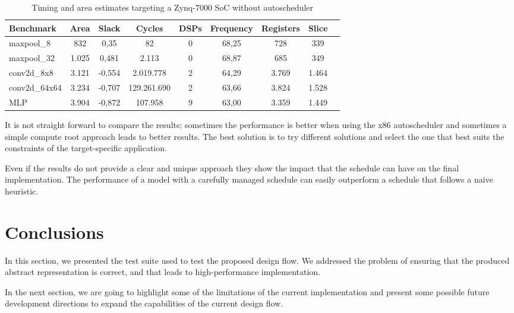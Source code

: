 \documentclass[../main.tex]{subfiles}
\begin{document}
\begin{table}[h]
\centering
\footnotesize
\setlength{\tabcolsep}{4pt}
\begin{tabular}{lcccccccc}
\hline
\textbf{Benchmark} & \textbf{Area} & \textbf{Slack} & \textbf{Cycles} & \textbf{DSPs} & \textbf{Frequency} & \textbf{Registers} & \textbf{Slice} \\ \hline
maxpool\_8       & 832    & 0,35  & 82           & 0             & 68,25              & 728        & 339        \\
maxpool\_32      & 1.025     & 0,481  & 2.113           & 0             & 68,87              & 685        & 349         \\
conv2d\_8x8   & 3.121    & -0,554  & 2.019.778           & 2            & 64,29              & 3.769        & 1.464        \\ 
conv2d\_64x64   & 3.234    & -0,707  & 129.261.690           & 2            & 63,66              & 3.824        & 1.528        \\ 
MLP          & 3.904     & -0,872  & 107.958               & 9             & 63,00              & 3.359        & 1.449        \\
\hline
\end{tabular}
\caption{Timing and area estimates targeting a Zynq-7000 SoC without autoscheduler}
\label{res-table1}
\end{table}

\bigskip
\bigskip

It is not straight forward to compare the results; sometimes the performance is better when using the x86 autoscheduler and sometimes a simple compute root approach leads to better results.
The best solution is to try different solutions and select the one that best suits the constraints of the target-specific application.

Even if the results do not provide a clear and unique approach they show the impact that the schedule can have on the final implementation.
The performance of a model with a carefully managed schedule can easily outperform a schedule that follows a naive heuristic.

\newpage

\section{Conclusions}
In this section, we presented the test suite used to test the proposed design flow.
We addressed the problem of ensuring that the produced abstract representation is correct, and that leads to high-performance implementation.

In the next section, we are going to highlight some of the limitations of the current implementation and present some possible future development directions to expand the capabilities of the current design flow.
\end{document}
